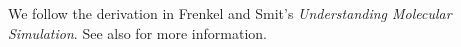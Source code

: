 

We follow the derivation in Frenkel and Smit's \emph{Understanding Molecular Simulation}\cite{frenkel2001understanding}. See also \cite{nose1984unified,hoover1985canonical} for more information.

